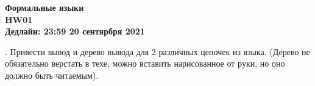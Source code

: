 \documentclass[12pt,a4paper]{article}%
\begin{document}

\begin{center}
\textbf{Формальные языки\\
HW01 \\
Дедлайн: 23:59 20 сентярбря 2021} \\
\end{center}

. Привести вывод и дерево вывода для 2 различных цепочек из языка. (Дерево не обязательно верстать в техе, можно вставить нарисованное от руки, но оно должно быть читаемым).


\end{document}
